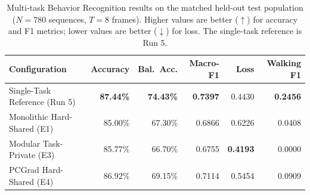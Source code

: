 \begin{table}[htbp]
\centering\small
\caption[Multi-task Behavior Recognition results]{Multi-task Behavior Recognition results on the matched held-out test population ($N = 780$ sequences, $T = 8$ frames). Higher values are better ($\uparrow$) for accuracy and F1 metrics; lower values are better ($\downarrow$) for loss. The single-task reference is Run 5.}
\label{tab:mtl_behavior_results}
\setlength{\tabcolsep}{2.2pt}
\begin{tabular}{lrrrrr}
\toprule
\textbf{Configuration} & \textbf{Accuracy} & \textbf{Bal.~Acc.} & \textbf{Macro-F1} & \textbf{Loss} & \textbf{Walking F1} \\
\midrule
Single-Task Reference (Run 5) & \textbf{87.44\%} & \textbf{74.43\%} & \textbf{0.7397} & 0.4430 & \textbf{0.2456} \\
Monolithic Hard-Shared (E1) & 85.00\% & 67.30\% & 0.6866 & 0.6226 & 0.0408 \\
Modular Task-Private (E3) & 85.77\% & 66.70\% & 0.6755 & \textbf{0.4193} & 0.0000 \\
PCGrad Hard-Shared (E4) & 86.92\% & 69.15\% & 0.7114 & 0.5454 & 0.0909 \\
\bottomrule
\end{tabular}
\end{table}
